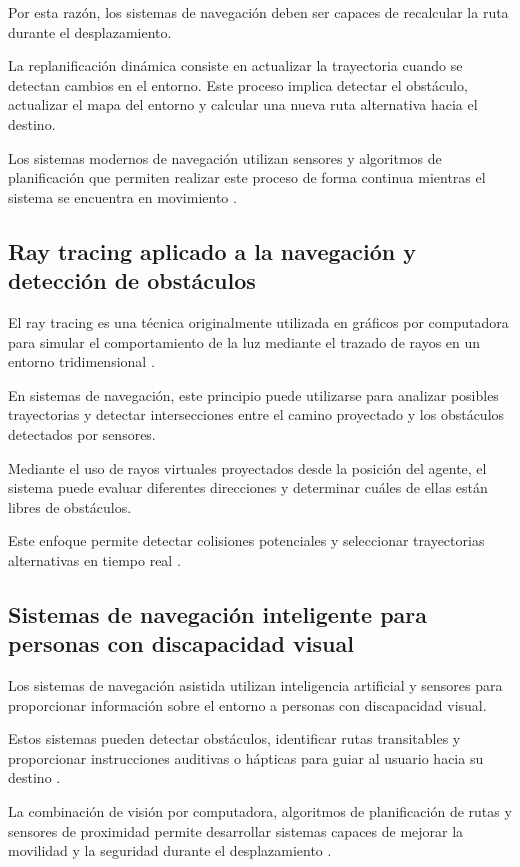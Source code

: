Por esta razón, los sistemas de navegación deben ser capaces de recalcular la ruta durante el desplazamiento.

La replanificación dinámica consiste en actualizar la trayectoria cuando se detectan cambios en el entorno. Este proceso implica detectar el obstáculo, actualizar el mapa del entorno y calcular una nueva ruta alternativa hacia el destino.

Los sistemas modernos de navegación utilizan sensores y algoritmos de planificación que permiten realizar este proceso de forma continua mientras el sistema se encuentra en movimiento \cite{fox1997dynamic}.

\subsection{Ray tracing aplicado a la navegación y detección de obstáculos}

El ray tracing es una técnica originalmente utilizada en gráficos por computadora para simular el comportamiento de la luz mediante el trazado de rayos en un entorno tridimensional \cite{lavalle2006planning}.

En sistemas de navegación, este principio puede utilizarse para analizar posibles trayectorias y detectar intersecciones entre el camino proyectado y los obstáculos detectados por sensores.

Mediante el uso de rayos virtuales proyectados desde la posición del agente, el sistema puede evaluar diferentes direcciones y determinar cuáles de ellas están libres de obstáculos.

Este enfoque permite detectar colisiones potenciales y seleccionar trayectorias alternativas en tiempo real \cite{fox1997dynamic}.

\subsection{Sistemas de navegación inteligente para personas con discapacidad visual}

Los sistemas de navegación asistida utilizan inteligencia artificial y sensores para proporcionar información sobre el entorno a personas con discapacidad visual.

Estos sistemas pueden detectar obstáculos, identificar rutas transitables y proporcionar instrucciones auditivas o hápticas para guiar al usuario hacia su destino \cite{thrun2005probabilistic}.

La combinación de visión por computadora, algoritmos de planificación de rutas y sensores de proximidad permite desarrollar sistemas capaces de mejorar la movilidad y la seguridad durante el desplazamiento \cite{fox1997dynamic, lavalle2006planning}.


